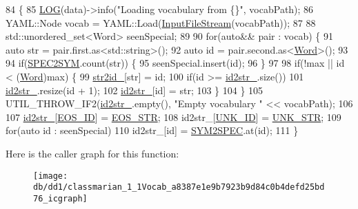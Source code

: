 \begin{DoxyCode}
84                                                     \{
85   \hyperlink{amun_2common_2logging_8h_a8cad147aca8c526d3c8a03ae14d5c87d}{LOG}(data)->info(\textcolor{stringliteral}{"Loading vocabulary from \{\}"}, vocabPath);
86   YAML::Node vocab = YAML::Load(\hyperlink{classInputFileStream}{InputFileStream}(vocabPath));
87 
88   std::unordered\_set<Word> seenSpecial;
89 
90   \textcolor{keywordflow}{for}(\textcolor{keyword}{auto}&& pair : vocab) \{
91     \textcolor{keyword}{auto} str = pair.first.as<std::string>();
92     \textcolor{keyword}{auto} \textcolor{keywordtype}{id} = pair.second.as<\hyperlink{namespacemarian_a5db8bee455c97a62d6a525dc48efe4c2}{Word}>();
93 
94     \textcolor{keywordflow}{if}(\hyperlink{namespacemarian_a53db7e8e290296787decc0fd95948535}{SPEC2SYM}.count(str)) \{
95       seenSpecial.insert(\textcolor{keywordtype}{id});
96     \}
97 
98     \textcolor{keywordflow}{if}(!max || \textcolor{keywordtype}{id} < (\hyperlink{namespacemarian_a5db8bee455c97a62d6a525dc48efe4c2}{Word})max) \{
99       \hyperlink{classmarian_1_1Vocab_ab79ee07a9432b1273fc4c92ea7390739}{str2id\_}[str] = id;
100       \textcolor{keywordflow}{if}(\textcolor{keywordtype}{id} >= \hyperlink{classmarian_1_1Vocab_a9ec3e11b136d7d75d8647471c28a5fac}{id2str\_}.size())
101         \hyperlink{classmarian_1_1Vocab_a9ec3e11b136d7d75d8647471c28a5fac}{id2str\_}.resize(\textcolor{keywordtype}{id} + 1);
102       \hyperlink{classmarian_1_1Vocab_a9ec3e11b136d7d75d8647471c28a5fac}{id2str\_}[id] = str;
103     \}
104   \}
105   UTIL\_THROW\_IF2(\hyperlink{classmarian_1_1Vocab_a9ec3e11b136d7d75d8647471c28a5fac}{id2str\_}.empty(), \textcolor{stringliteral}{"Empty vocabulary "} << vocabPath);
106 
107   \hyperlink{classmarian_1_1Vocab_a9ec3e11b136d7d75d8647471c28a5fac}{id2str\_}[\hyperlink{namespacemarian_a58eb44c6e8969831f40ee27feeed33ed}{EOS\_ID}] = \hyperlink{namespacemarian_ae9a4ff3b7d4df0a6ea4a710810c5b6f6}{EOS\_STR};
108   id2str\_[\hyperlink{namespacemarian_abe23e32294ac45b7fe50b5ee8d7da9ba}{UNK\_ID}] = \hyperlink{namespacemarian_a85fabda4ef9ec625d0c992f81292dc92}{UNK\_STR};
109   \textcolor{keywordflow}{for}(\textcolor{keyword}{auto} \textcolor{keywordtype}{id} : seenSpecial)
110     id2str\_[id] = \hyperlink{namespacemarian_a70398af3e3d1cc14ff372edcdc1a2595}{SYM2SPEC}.at(\textcolor{keywordtype}{id});
111 \}
\end{DoxyCode}


Here is the caller graph for this function\+:
\nopagebreak
\begin{figure}[H]
\begin{center}
\leavevmode
\texttt{[image: db/dd1/classmarian\_1\_1Vocab\_a8387e1e9b7923b9d84c0b4defd25bd76\_icgraph]}
\end{center}
\end{figure}


